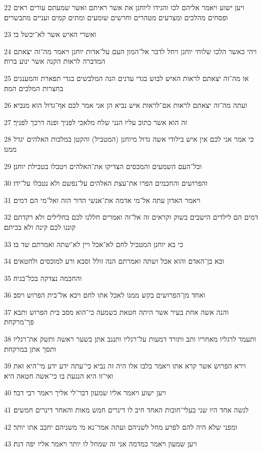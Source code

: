 \par 22 ויען ישוע ויאמר אליהם לכו והגידו ליוחנן את אשר ראיתם ואשר שמעתם עורים ראים ופסחים מהלכים ומצרעים מטהרים וחרשים שומעים ומתים קמים ועניים מתבשרים׃
\par 23 ואשרי האיש אשר לא־יכשל בי׃
\par 24 ויהי כאשר הלכו שלוחי יוחנן ויחל לדבר אל־המון העם על־אדות יוחנן ויאמר מה־זה יצאתם המדברה לראות הקנה אשר ינוע ברוח׃
\par 25 או מה־זה יצאתם לראות האיש לבוש בגדי עדנים הנה המלבשים בגדי תפארת והמענגים בחצרות המלכים המה׃
\par 26 ועתה מה־זה יצאתם לראות אם־לראות איש נביא הן אני אמר לכם אף־גדול הוא מנביא׃
\par 27 זה הוא אשר כתוב עליו הנני שלח מלאכי לפניך ופנה דרכך לפניך׃
\par 28 כי אמר אני לכם אין איש בילודי אשה גדול מיוחנן (המטביל) והקטן במלכות האלהים יגדל ממנו׃
\par 29 וכל־העם השמעים והמכסים הצדיקו את־האלהים ויטבלו בטבילת יוחנן׃
\par 30 והפרושים והחכמים הפרו את־עצת האלהים על־נפשם ולא נטבלו על־ידו׃
\par 31 ויאמר האדון עתה אל־מי אדמה את־אנשי הדור הזה ואל־מי הם דמים׃
\par 32 דמים הם לילדים הישבים בשוק וקראים זה אל־זה ואמרים חללנו לכם בחלילים ולא רקדתם קוננו לכם קינה ולא בכיתם׃
\par 33 כי בא יוחנן המטביל לחם לא־אכל ויין לא־שתה ואמרתם שד בו׃
\par 34 ובא בן־האדם והוא אכל ושתה ואמרתם הנה זולל וסבא ורע למוכסים ולחטאים׃
\par 35 והחכמה נצדקה בכל־בניה׃
\par 36 ואחד מן־הפרושים בקש ממנו לאכל אתו לחם ויבא אל־בית הפרוש ויסב׃
\par 37 והנה אשה אחת בעיר אשר היתה חטאת כשמעה כי־הוא מסב בית הפרוש ותבא פך־מרקחת׃
\par 38 ותעמד לרגליו מאחריו ותב ותורד דמעות על־רגליו ותנגב אתן בשער ראשה ותשק את־רגליו ותסך אתן במרקחת׃
\par 39 וירא הפרוש אשר קרא אתו ויאמר בלבו אלו היה זה נביא כי־עתה ידע ידע מי־היא זאת ואי־זו היא הנגעת בו כי־אשה חטאה היא׃
\par 40 ויען ישוע ויאמר אליו שמעון דבר־לי אליך ויאמר רבי דבר׃
\par 41 לנשה אחד היו שני בעלי־חובות האחד חיב לו דינרים חמש מאות והאחר דינרים חמשים׃
\par 42 ומפני שלא היה להם לפרע מחל לשניהם ועתה אמר־נא מי משניהם יחבב אתו יותר׃
\par 43 ויען שמעון ויאמר כמדמה אני זה שמחל לו יותר ויאמר אליו יפה דנת׃
